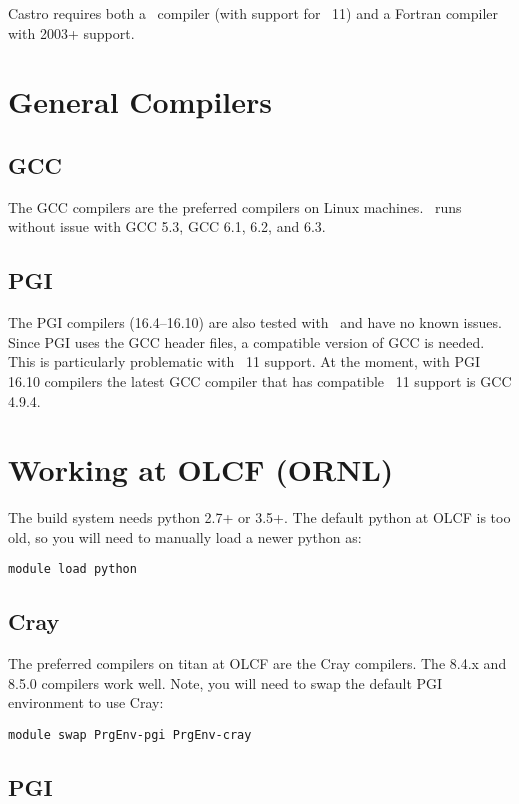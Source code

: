 Castro requires both a \cpp\ compiler (with support for \cpp\ 11) and
a Fortran compiler with 2003+ support.

\section{General Compilers}

\subsection{GCC}
The GCC compilers are the preferred compilers on Linux machines.
\castro\ runs without issue with GCC 5.3, GCC 6.1, 6.2, and 6.3.

\subsection{PGI}

The PGI compilers (16.4--16.10) are also tested with \castro\ and have
no known issues.  Since PGI uses the GCC header files, a compatible
version of GCC is needed.  This is particularly problematic with \cpp~11
support.  At the moment, with PGI 16.10 compilers the latest GCC compiler
that has compatible \cpp~11 support is GCC 4.9.4.

\section{Working at OLCF (ORNL)}

The build system needs python 2.7+ or 3.5+.  The default python at OLCF
is too old, so you will need to manually load a newer python as:
\begin{verbatim}
module load python
\end{verbatim}

\subsection{Cray}
The preferred compilers on titan at OLCF are the Cray compilers.  The
8.4.x and 8.5.0 compilers work well.  Note, you will need to swap
the default PGI environment to use Cray:
\begin{verbatim}
module swap PrgEnv-pgi PrgEnv-cray
\end{verbatim}

\subsection{PGI}

